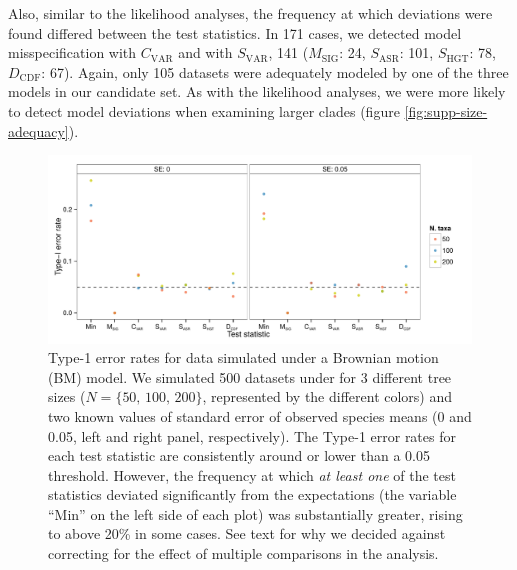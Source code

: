 \documentclass[12pt,twoside]{article}
\begin{document}
Also, similar to the likelihood analyses, the frequency at which deviations were found differed between the test statistics. In 171 cases, we detected model misspecification with $C_{\text{VAR}}$ and with $S_{\text{VAR}}$, 141 ($M_{\text{SIG}}$: 24, $S_{\text{ASR}}$: 101, $S_{\text{HGT}}$: 78, $D_{\text{CDF}}$: 67). Again, only 105 datasets were adequately modeled by one of the three models in our candidate set. As with the likelihood analyses, we were more likely to detect model deviations when examining larger clades (figure \ref{fig:supp-size-adequacy}).
 
\newpage
\listoffigures
\renewcommand\thefigure{S\arabic{figure}}
\renewcommand\thetable{S \arabic{table}}
\setcounter{figure}{0}    
\setcounter{table}{0}

\begin{figure}[p]
  \centering
  \includegraphics[width=\textwidth]{figs/bm-sim-res}
  \caption[Type-1 error rates for BM simulations]{Type-1 error rates for data simulated under a Brownian motion (BM) model. We simulated 500 datasets under for 3 different tree sizes ($N=\lbrace \text{50, 100, 200} \rbrace $, represented by the different colors) and two known values of standard error of observed species means (0 and 0.05, left and right panel, respectively). The Type-1 error rates for each test statistic are consistently around or lower than a 0.05 threshold. However, the frequency at which \emph{at least one} of the test statistics deviated significantly from the expectations (the variable ``Min'' on the left side of each plot) was substantially greater, rising to above 20\% in some cases. See text for why we decided against correcting for the effect of multiple comparisons in the analysis.}
  \label{fig:bm-sim}
\end{figure}
\end{document}
